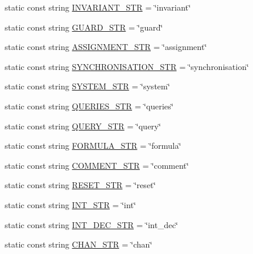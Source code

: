 \begin{DoxyCompactItemize}
static const string \mbox{\hyperlink{namespacegraphsat_a9ac16cae7c55ccd846c214033d153242}{I\+N\+V\+A\+R\+I\+A\+N\+T\+\_\+\+S\+TR}} = \char`\"{}invariant\char`\"{}
\item 
static const string \mbox{\hyperlink{namespacegraphsat_a5cf783f9d091f218e135024fad71f9c0}{G\+U\+A\+R\+D\+\_\+\+S\+TR}} = \char`\"{}guard\char`\"{}
\item 
static const string \mbox{\hyperlink{namespacegraphsat_ad52aff2b01d385e5c1f1d2ad4200458b}{A\+S\+S\+I\+G\+N\+M\+E\+N\+T\+\_\+\+S\+TR}} = \char`\"{}assignment\char`\"{}
\item 
static const string \mbox{\hyperlink{namespacegraphsat_a5a0a13eee450263b2af1dbfbace2c1ba}{S\+Y\+N\+C\+H\+R\+O\+N\+I\+S\+A\+T\+I\+O\+N\+\_\+\+S\+TR}} = \char`\"{}synchronisation\char`\"{}
\item 
static const string \mbox{\hyperlink{namespacegraphsat_a60af197840a4b415e8873c4f31e8dd79}{S\+Y\+S\+T\+E\+M\+\_\+\+S\+TR}} = \char`\"{}system\char`\"{}
\item 
static const string \mbox{\hyperlink{namespacegraphsat_ae092a66a8c0635f0aa193e115cd5cd6c}{Q\+U\+E\+R\+I\+E\+S\+\_\+\+S\+TR}} = \char`\"{}queries\char`\"{}
\item 
static const string \mbox{\hyperlink{namespacegraphsat_a82009cb606aa65bbf2b2699c864cfcae}{Q\+U\+E\+R\+Y\+\_\+\+S\+TR}} = \char`\"{}query\char`\"{}
\item 
static const string \mbox{\hyperlink{namespacegraphsat_a603b9f08434ec8fa84ed6783949ce1c2}{F\+O\+R\+M\+U\+L\+A\+\_\+\+S\+TR}} = \char`\"{}formula\char`\"{}
\item 
static const string \mbox{\hyperlink{namespacegraphsat_aaff3a72df6b078c90dec9769fa169109}{C\+O\+M\+M\+E\+N\+T\+\_\+\+S\+TR}} = \char`\"{}comment\char`\"{}
\item 
static const string \mbox{\hyperlink{namespacegraphsat_a79b644336da8e9e4e9ced23332b87623}{R\+E\+S\+E\+T\+\_\+\+S\+TR}} = \char`\"{}reset\char`\"{}
\item 
static const string \mbox{\hyperlink{namespacegraphsat_acc57ed3dc3b16544da58969d55cc7b95}{I\+N\+T\+\_\+\+S\+TR}} = \char`\"{}int\char`\"{}
\item 
static const string \mbox{\hyperlink{namespacegraphsat_aa9a1e8f08a3a50aa74eb06b5eea6b20f}{I\+N\+T\+\_\+\+D\+E\+C\+\_\+\+S\+TR}} = \char`\"{}int\+\_\+dec\char`\"{}
\item 
static const string \mbox{\hyperlink{namespacegraphsat_a44dce1c8f03d79abf9223c28a5f71c5f}{C\+H\+A\+N\+\_\+\+S\+TR}} = \char`\"{}chan\char`\"{}
\item 

\end{DoxyCompactItemize}
